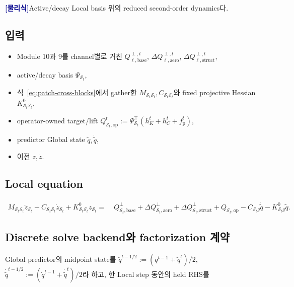\documentclass[11pt,a4paper]{article}
\newcommand{\physics}{\textcolor{darkblue}{\textbf{[물리식]}}}
\begin{document}
\physics Active/decay Local basis 위의 reduced second-order dynamics다.

\subsection*{입력}

\begin{itemize}[leftmargin=1.5em]
  \item Module 10과 9를 channel별로 거친
  \(Q_{\ell,\mathrm{base}}^{\perp,t}\),
  \(\Delta Q_{\ell,\mathrm{aero}}^{\perp,t}\),
  \(\Delta Q_{\ell,\mathrm{struct}}^{\perp,t}\),
  \item active/decay basis \(\Psi_{\mathcal S_t}\),
  \item 식~\eqref{eq:patch-cross-blocks}에서 gather한
  \(M_{\mathcal S_t\mathcal S_t},C_{\mathcal S_t\mathcal S_t}\)와
  fixed projective Hessian \(K_{\mathcal S_t\mathcal S_t}^{0}\),
  \item operator-owned target/lift
  \(Q_{\mathcal S_t,\mathrm{op}}^t
  :=\Psi_{\mathcal S_t}^\top(h_K^t+h_C^t+f_{\mathrm p}^t)\),
  \item predictor Global state \(\widetilde q,\dot{\widetilde q}\),
  \item 이전 \(z,\dot z\).
\end{itemize}

\subsection*{Local equation}

\begin{equation}
\begin{aligned}
M_{\mathcal S_t\mathcal S_t}\ddot z_{\mathcal S_t}
  +C_{\mathcal S_t\mathcal S_t}\dot z_{\mathcal S_t}
  +K_{\mathcal S_t\mathcal S_t}^{0}z_{\mathcal S_t}
  =&\;
  Q_{\mathcal S_t,\mathrm{base}}^{\perp}
  +\Delta Q_{\mathcal S_t,\mathrm{aero}}^{\perp}
  +\Delta Q_{\mathcal S_t,\mathrm{struct}}^{\perp}
  +Q_{\mathcal S_t,\mathrm{op}}
  -C_{\mathcal S_t g}\dot{\widetilde q}
  -K_{\mathcal S_t g}^{0}\widetilde q.
  \label{eq:local-dynamics}
\end{aligned}
\end{equation}

\subsection*{Discrete solve backend와 factorization 계약}

Global predictor의 midpoint state를
\(\widetilde q^{t-1/2}:=(q^{t-1}+\widetilde q^t)/2\),
\(\dot{\widetilde q}^{t-1/2}:=(\dot q^{t-1}+\dot{\widetilde q}^t)/2\)라 하고,
한 Local step 동안의 held RHS를
\end{document}
